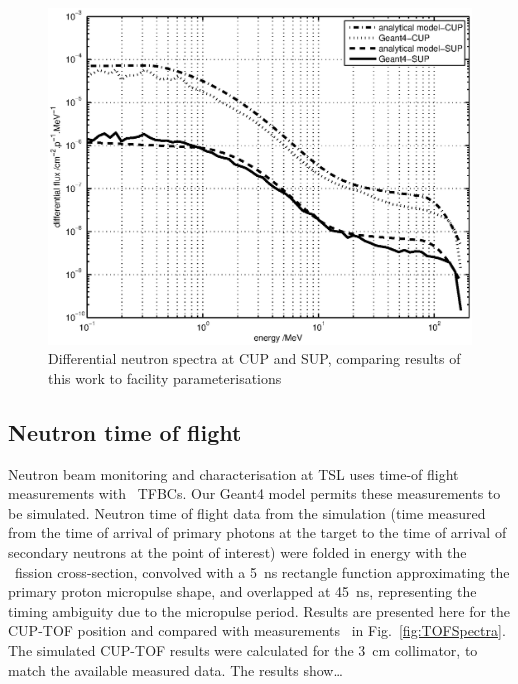 \documentclass[11pt,a4paper]{IEEEtran}
\let\MYoriglatexcaption\caption
\renewcommand{\caption}[2][\relax]{\MYoriglatexcaption[#2]{#2}}
\def\U238{\BPChem{\^{238}U}}
\begin{document}
\begin{figure}[t]
    \centering
    \includegraphics[width=\columnwidth]{DiffYieldComparedSUPCUP10.eps}
    \caption{
        Differential neutron spectra at CUP and SUP, comparing results of this work to facility parameterisations~\cite{Prokofiev2009,Prokofiev14}
    }
    \label{fig:DifferentialSpectra}
\end{figure}

\subsection{Neutron time of flight}
Neutron beam monitoring and characterisation at TSL uses time-of flight measurements with \U238\ TFBCs.
Our Geant4 model permits these measurements to be simulated.
Neutron time of flight data from the simulation (time measured from the time of arrival of primary photons at the target to the time of arrival of secondary neutrons at the point of interest) were folded in energy with the \U238\ fission cross-section, convolved with a \SI{5}{\ns} rectangle function approximating the primary proton micropulse shape, and overlapped at \SI{45}{\ns}, representing the timing ambiguity due to the micropulse period.
Results are presented here for the CUP-TOF position and compared with measurements~\cite{Prokofiev14} in Fig.~\ref{fig:TOFSpectra}.
The simulated CUP-TOF results were calculated for the \SI{3}{\cm} collimator, to match the available measured data.
The results show\ldots
{}
\end{document}
